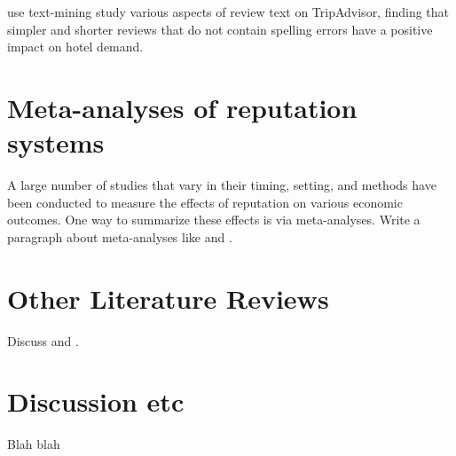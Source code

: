 \documentclass[letter,12pt]{article}
\begin{document}
\citet{ghose2012designing} use text-mining study various aspects of review
text on TripAdvisor, finding that simpler and shorter reviews that do not
contain spelling errors have a positive impact on hotel demand.

\section{Meta-analyses of reputation systems}

A large number of studies that vary in their timing, setting, and methods have
been conducted to measure the effects of reputation on various economic
outcomes. One way to summarize these effects is via meta-analyses. Write a
paragraph about meta-analyses like \citet{babic2016effect} and
\citet{floyd2014online}.

\section{Other Literature Reviews}

Discuss \citet{dellarocas2003digitization} and \citet{luca2015user}.

\section{Discussion etc}

Blah blah

\printbibliography
\end{document}

